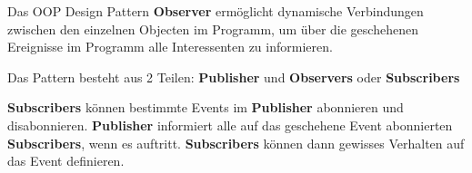 Das OOP Design Pattern \textbf{Observer} ermöglicht dynamische Verbindungen zwischen den einzelnen 
Objecten im Programm, um über die geschehenen Ereignisse im Programm alle Interessenten 
zu informieren.

Das Pattern besteht aus 2 Teilen: \textbf{Publisher} und \textbf{Observers} oder \textbf{Subscribers}

\textbf{Subscribers} können bestimmte Events im \textbf{Publisher} abonnieren und disabonnieren.
\textbf{Publisher} informiert alle auf das geschehene Event abonnierten \textbf{Subscribers}, wenn es auftritt. 
\textbf{Subscribers} können dann gewisses Verhalten auf das Event definieren.
